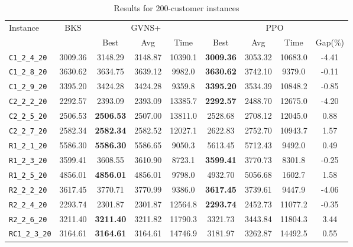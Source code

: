 \begin{table}[ht]
\centering
\small
\setlength{\tabcolsep}{5pt}
\caption{Results for 200-customer instances}
\vspace{4mm}
\begin{adjustbox}{width=\textwidth}
\begin{tabular}{l c c c c @{\hspace{8pt}} c c c c @{\hspace{8pt}}}
\toprule
\multirow{2}{*}{Instance} & \multirow{2}{*}{BKS} & \multicolumn{3}{c}{GVNS+} & \multicolumn{4}{c}{PPO} \\
\cmidrule(lr){3-5} \cmidrule(lr){6-9}
 &  & Best & Avg & Time & Best & Avg & Time & Gap(\%) \\
\midrule
\texttt{C1\_2\_4\_20} & 3009.36 & 3148.29 & 3148.87 & 10390.1 & \textbf{3009.36} & 3053.32 & 10683.0 & -4.41 \\
\texttt{C1\_2\_8\_20} & 3630.62 & 3634.75 & 3639.12 & 9982.0 & \textbf{3630.62} & 3742.10 & 9379.0 & -0.11 \\
\texttt{C1\_2\_9\_20} & 3395.20 & 3424.28 & 3424.28 & 9359.8 & \textbf{3395.20} & 3534.39 & 10848.2 & -0.85 \\
\texttt{C2\_2\_2\_20} & 2292.57 & 2393.09 & 2393.09 & 13385.7 & \textbf{2292.57} & 2488.70 & 12675.0 & -4.20 \\
\texttt{C2\_2\_5\_20} & 2506.53 & \textbf{2506.53} & 2507.00 & 13811.0 & 2528.68 & 2708.12 & 12045.0 & 0.88 \\
\texttt{C2\_2\_7\_20} & 2582.34 & \textbf{2582.34} & 2582.52 & 12027.1 & 2622.83 & 2752.70 & 10943.7 & 1.57 \\
\texttt{R1\_2\_1\_20} & 5586.30 & \textbf{5586.30} & 5586.65 & 9050.3 & 5613.45 & 5712.43 & 9492.0 & 0.49 \\
\texttt{R1\_2\_3\_20} & 3599.41 & 3608.55 & 3610.90 & 8723.1 & \textbf{3599.41} & 3770.73 & 8301.8 & -0.25 \\
\texttt{R1\_2\_5\_20} & 4856.01 & \textbf{4856.01} & 4856.01 & 9798.0 & 4932.70 & 5056.68 & 1602.7 & 1.58 \\
\texttt{R2\_2\_2\_20} & 3617.45 & 3770.71 & 3770.99 & 9386.0 & \textbf{3617.45} & 3739.61 & 9447.9 & -4.06 \\
\texttt{R2\_2\_4\_20} & 2293.74 & 2301.87 & 2301.87 & 12564.8 & \textbf{2293.74} & 2452.73 & 11077.2 & -0.35 \\
\texttt{R2\_2\_6\_20} & 3211.40 & \textbf{3211.40} & 3211.82 & 11790.3 & 3321.73 & 3443.84 & 11804.3 & 3.44 \\
\texttt{RC1\_2\_3\_20} & 3164.61 & \textbf{3164.61} & 3164.61 & 14746.9 & 3181.97 & 3262.87 & 14492.5 & 0.55 \\

\end{tabular}
\end{adjustbox}
\end{table}
